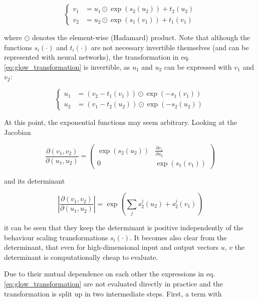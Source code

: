\begin{equation}
	\left\{\begin{aligned}
		v_1 &= u_1 \odot \exp(s_2(u_2)) + t_2(u_2) \\
		v_2 &= u_2 \odot \exp(s_1(v_1)) + t_1(v_1)
	\end{aligned}\right.
	\label{eq:glow_transformation}
\end{equation}

where $\odot$ denotes the element-wise (Hadamard) product. Note that although the functions $s_i(\cdot)$ and $t_i(\cdot)$ are not necessary invertible themselves (and can be represented with neural networks), the transformation in eq. \ref{eq:glow_transformation} is invertible, as $u_1$ and $u_2$ can be expressed with $v_1$ and $v_2$:

\begin{equation*}
	\left\{\begin{aligned}
		u_1 &= (v_2 - t_1(v_1)) \odot \exp(-s_1(v_1)) \\
		u_2 &= (v_1 - t_2(u_2)) \odot \exp(-s_2(u_2)) 
	\end{aligned}\right.
\end{equation*}

At this point, the exponential functions may seem arbitrary. Looking at the Jacobian

\begin{equation*}
	\frac{\partial (v_1, v_2)}{\partial(u_1, u_2)} = \left(\begin{matrix}
		\exp(s_2(u_2)) & \frac{\partial v_1}{\partial u_2} \\
		0             & \exp(s_1(v_1))
	\end{matrix}\right)
\end{equation*}

and its determinant

\begin{equation*}
	\left|\frac{\partial (v_1, v_2)}{\partial (u_1, u_2)} \right| = \exp \left(\sum_j s^j_2(u_2) + s^j_2(v_1) \right)
\end{equation*}

it can be seen that they keep the determinant is positive independently of the behaviour scaling transformations $s_i(\cdot)$. It becomes also clear from the determinant, that even for high-dimensional input and output vectors $u$, $v$ the determinant is computationally cheap to evaluate.

Due to their mutual dependence on each other the expressions in eq. \ref{eq:glow_transformation} are not evaluated directly in practice and the transformation is split up in two intermediate steps. First, a term with

